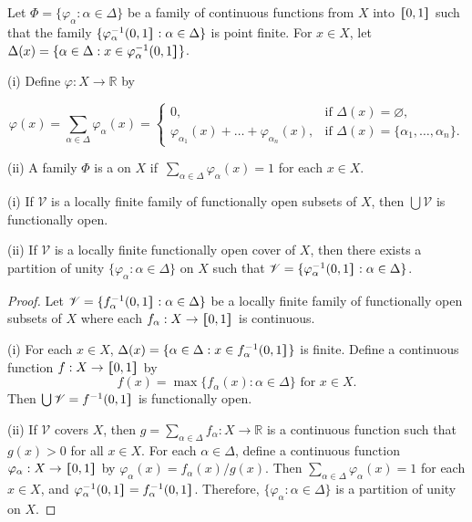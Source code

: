 \documentclass[prelim.tex]{subfiles}
\begin{document}
{ \label{def:1.3.7}
Let $\Phi = \{\varphi_\alpha: \alpha \in \Delta\}$ be a family of continuous functions from $X$ into $\hstretch{1.8}{[}0, 1\hstretch{1.8}{]}$ such that the family 
$\{\varphi_\alpha^{-1}(0, 1\hstretch{1.8}{]}: \alpha \in \Delta\}$ is point finite. 
For $x \in X$, let $\Delta(x) = \{\alpha \in \Delta: x \in\varphi_\alpha^{-1}(0, 1\hstretch{1.8}{]}\}$.

\textup{(i)} Define $\varphi: X \rightarrow \mathbb{R}$ by 

$$\varphi(x) = \sum_{\alpha \in \Delta} \varphi_\alpha(x) = 
\begin{cases} 0, 
	& \text{if } \Delta(x) = \varnothing, 
	\\ \varphi_{\alpha_1}(x) + \dots + \varphi_{\alpha_n}(x), 
	& \text{if } \Delta(x) = \{\alpha_1, \dots, \alpha_n\}. 
\end{cases}$$

\textup{(ii)} A family $\Phi$ is a 
 on $X$ if $\,\sum_{\alpha \in \Delta} \varphi_\alpha(x) = 1$ for each $x \in X$.
}


{\lemma{}\label{lem:1.3.8}
\textup{(i)} If $\mathscr{V}$ is a locally finite family of functionally open subsets of $X$, 
then $\bigcup \mathscr{V}$ is functionally open.

\textup{(ii)}  If $\mathscr{V}$ is a locally finite functionally open cover of $X$, 
then there exists a partition of unity $\{\varphi_\alpha: \alpha\in\Delta\}$ on $X$ 
such that $\mathscr{V} = \{\varphi_\alpha^{-1}(0, 1\hstretch{1.8}{]}:  \alpha\in\Delta\}$.
}

\begin{proof} 
 Let $\mathscr{V} = \{f_\alpha^{-1}(0, 1\hstretch{1.8}{]}: \alpha \in \Delta\}$ be a locally finite
 family of functionally open subsets of $X$ where each $f_\alpha: X \rightarrow \hstretch{1.8}{[}0, 1\hstretch{1.8}{]}$ is continuous.

(i) For each $x \in X$, $\Delta(x) = \{\alpha \in \Delta: x \in f_\alpha^{-1}(0, 1\hstretch{1.8}{]}\}$ is finite.
Define a continuous function $f: X \rightarrow \hstretch{1.8}{[}0, 1\hstretch{1.8}{]}$ by
$$f(x) = \max \{ f_\alpha(x): \alpha \in \Delta \} \text{ for } x\in X.$$
Then $\bigcup \mathscr{V} = f^{-1}(0, 1\hstretch{1.8}{]}$ is functionally open.

(ii) If $\mathscr{V}$ covers $X$, then 
$g = \sum_{\alpha\in\Delta}f_\alpha: X \rightarrow \mathbb{R}$ 
is a continuous function such that $g(x) > 0$ for all $x\in X$. 
For each $\alpha \in \Delta$, define a continuous function 
$\varphi_\alpha: X \rightarrow \hstretch{1.8}{[}0, 1\hstretch{1.8}{]}$ by $\varphi_\alpha(x) = f_\alpha(x) /g(x)$. 
Then $\sum_{\alpha\in\Delta}\varphi_\alpha(x) = 1$ for each $x \in X$,
and  $\varphi_\alpha^{-1}(0, 1\hstretch{1.8}{]} = f_\alpha^{-1}(0, 1\hstretch{1.8}{]}$.
Therefore, $\{\varphi_\alpha: \alpha\in \Delta\}$ is a partition of unity on $X$.
\end{proof} 
\end{document}
